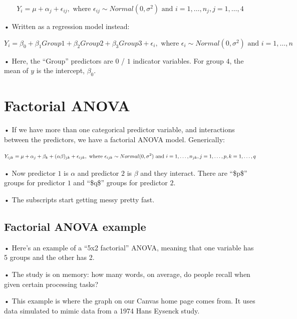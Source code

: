 \documentclass[
  letterpaper,
  DIV=11,
  numbers=noendperiod]{scrreprt}
\begin{document}
\[
Y_i = \mu + \alpha_j + \epsilon_{ij}, \text{ where } \epsilon_{ij} \sim Normal(0,\sigma^2) \text{ and } i = 1, \dots ,n_j, j = 1, \dots, 4
\]

• Written as a regression model instead:

\[
Y_i = \beta_0 +\beta_1Group1 + \beta_2Group2 + \beta_3Group3 + \epsilon_{i}, \text{ where } \epsilon_{i} \sim Normal(0,\sigma^2) \text{ and } i = 1, \dots ,n
\]

• Here, the ``Group'' predictors are \(0\) / \(1\) indicator variables.
For group \(4\), the mean of \(y\) is the intercept, \(\beta_0\).

\hypertarget{factorial-anova}{%
\section{Factorial ANOVA}\label{factorial-anova}}

• If we have more than one categorical predictor variable, and
interactions between the predictors, we have a factorial ANOVA model.
Generically:

\[
Y_{ijk} = \mu + \alpha_j + \beta_k + (\alpha\beta)_{jk} + \epsilon_{ijk}, \text{ where } \epsilon_{ijk} \sim Normal(0,\sigma^2) \\
\text{ and } i = 1, \dots ,n_{jk}, j = 1, \dots, p, k = 1, \dots,q
\]

• Now predictor \(1\) is \(\alpha\) and predictor \(2\) is \(\beta\) and
they interact. There are ``\$p\$'' groups for predictor \(1\) and
``\$q\$'' groups for predictor \(2\).

• The subscripts start getting messy pretty fast.

\hypertarget{factorial-anova-example}{%
\subsection{Factorial ANOVA example}\label{factorial-anova-example}}

• Here's an example of a ``5x2 factorial'' ANOVA, meaning that one
variable has 5 groups and the other has 2.

• The study is on memory: how many words, on average, do people recall
when given certain processing tasks?

• This example is where the graph on our Canvas home page comes from. It
uses data simulated to mimic data from a 1974 Hans Eysenck study.
\end{document}
